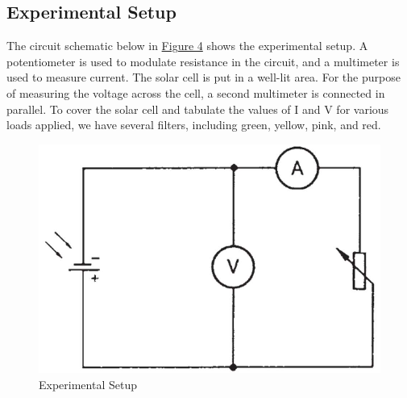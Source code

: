 	\subsection{Experimental Setup}

	The circuit schematic below in \hyperref[fig:4]{Figure 4} shows the experimental setup. A potentiometer is used to modulate resistance in the circuit, and a multimeter is used to measure current. The solar cell is put in a well-lit area. For the purpose of measuring the voltage across the cell, a second multimeter is connected in parallel. To cover the solar cell and tabulate the values of I and V for various loads applied, we have several filters, including green, yellow, pink, and red.

	\begin{figure}[h]
		\centering
		\includegraphics[width=0.8\columnwidth]{images/theory4.png}
		\caption{Experimental Setup}
		\label{fig:4}
	\end{figure}
